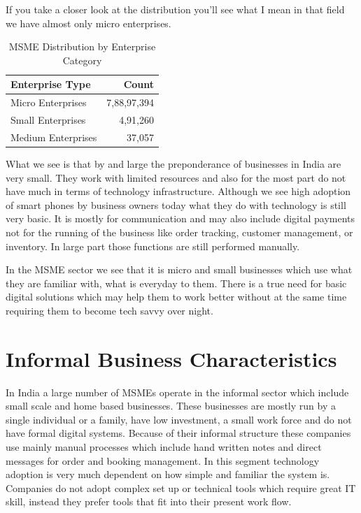 If you take a closer look at the distribution you'll see what I mean in that field we have almost only micro enterprises.


\begin{table}[htbp]
\centering
\small
\begin{tabular}{|l|r|}
\hline
\textbf{Enterprise Type} & \textbf{Count} \\
\hline
Micro Enterprises & 7,88,97,394 \\
Small Enterprises & 4,91,260 \\
Medium Enterprises & 37,057 \\
\hline
\end{tabular}
\caption{MSME Distribution by Enterprise Category \cite{msme_annual_report}}
\end{table}

What we see is that by and large the preponderance of businesses in India are very small. They work with limited resources and also for the most part do not have much in terms of technology infrastructure. Although we see high adoption of smart phones by business owners today what they do with technology is still very basic. It is mostly for communication and may also include digital payments not for the running of the business like order tracking, customer management, or inventory. In large part those functions are still performed manually.

In the MSME sector we see that it is micro and small businesses which use what they are familiar with, what is everyday to them. There is a true need for basic digital solutions which may help them to work better without at the same time requiring them to become tech savvy over night.


\section{Informal Business Characteristics}

In India a large number of MSMEs operate in the informal sector which include small scale and home based businesses. These businesses are mostly run by a single individual or a family, have low investment, a small work force and do not have formal digital systems. Because of their informal structure these companies use mainly manual processes which include hand written notes and direct messages for order and booking management. In this segment technology adoption is very much dependent on how simple and familiar the system is. Companies do not adopt complex set up or technical tools which require great IT skill, instead they prefer tools that fit into their present work flow.

